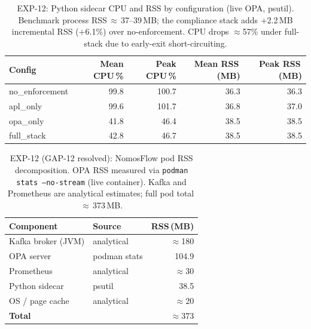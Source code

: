 \begin{table}[t]
\centering
\small
\caption{EXP-12: Python sidecar CPU and RSS by configuration (live OPA, psutil).
  Benchmark process RSS\,$\approx$\,37--39\,MB; the compliance stack adds
  $+$2.2\,MB incremental RSS ($+$6.1\%) over no-enforcement.
  CPU drops $\approx$57\% under full-stack due to early-exit short-circuiting.}
\label{tab:exp12-resource}
\begin{tabular}{lrrrr}
\hline
\textbf{Config} & \textbf{Mean CPU\,\%} & \textbf{Peak CPU\,\%} & \textbf{Mean RSS\,(MB)} & \textbf{Peak RSS\,(MB)} \\
\hline
no\_enforcement & 99.8 & 100.7 & 36.3 & 36.3 \\
apl\_only       & 99.6 & 101.7 & 36.8 & 37.0 \\
opa\_only       & 41.8 &  46.4 & 38.5 & 38.5 \\
full\_stack     & 42.8 &  46.7 & 38.5 & 38.5 \\
\hline
\end{tabular}
\end{table}

\begin{table}[t]
\centering
\small
\caption{EXP-12 (GAP-12 resolved): NomosFlow pod RSS decomposition.
  OPA RSS measured via \texttt{podman stats --no-stream} (live container).
  Kafka and Prometheus are analytical estimates; full pod total\,$\approx$\,373\,MB.}
\label{tab:exp12-podman}
\begin{tabular}{llr}
\hline
\textbf{Component} & \textbf{Source} & \textbf{RSS\,(MB)} \\
\hline
Kafka broker (JVM) & analytical   & $\approx$180 \\
OPA server         & podman stats & 104.9 \\
Prometheus         & analytical   & $\approx$30  \\
Python sidecar     & psutil       & 38.5  \\
OS / page cache    & analytical   & $\approx$20  \\
\hline
\textbf{Total}     &              & $\approx$373 \\
\hline
\end{tabular}
\end{table}

